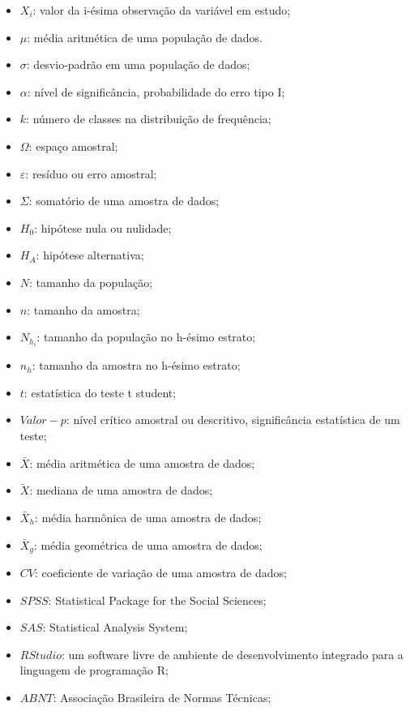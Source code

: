 \begin{refsection}

\begin{itemize}
\item $X_{i}$: valor da i-ésima observação da variável em estudo;
\item $\mu$: média aritmética de uma população de dados.
\item $\sigma$: desvio-padrão em uma população de dados;
\item $\alpha$: nível de significância, probabilidade do erro tipo I;
\item $k$: número de classes na distribuição de frequência;
\item $\Omega$: espaço amostral;
\item $\varepsilon$: resíduo ou erro amostral;
\item $\Sigma$: somatório de uma amostra de dados;
\item $H_{0}$: hipótese nula ou nulidade;
\item $H_{A}$: hipótese alternativa;
\item $N$: tamanho da população; 
\item $n$: tamanho da amostra;
\item $N_{h_{i}}$: tamanho da população no h-ésimo estrato;
\item $n_{h}$: tamanho da amostra no h-ésimo estrato;
\item $t$: estatística do teste t student;
\item $Valor-p$: nível crítico amostral ou descritivo, significância estatística de um teste;
\item $\bar{X}$: média aritmética de uma amostra de dados;
\item $\widetilde{X}$: mediana de uma amostra de dados; 
\item $\bar{X}_{h}$: média harmônica de uma amostra de dados;  
\item $\bar{X}_{g}$: média geométrica de uma amostra de dados;
\item $CV$: coeficiente de variação de uma amostra de dados;
\item $SPSS$: Statistical Package for the Social Sciences;
\item $SAS$: Statistical Analysis System;
\item $RStudio$: um software livre de ambiente de desenvolvimento integrado para a linguagem de programação R;
\item $ABNT$: Associação Brasileira de Normas Técnicas;

\end{itemize}
\end{refsection}

